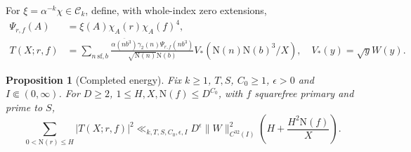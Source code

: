 \documentclass[11pt,a4paper]{article}
\numberwithin{equation}{section}
\newtheorem{proposition}[theorem]{Proposition}
\theoremstyle{definition}
\theoremstyle{remark}
\newcommand{\N}{\mathrm N}
\begin{document}
For $\xi=\alpha^{-k}\chi\in\mathscr C_k$, define, with whole-index zero extensions,
\begin{align}\label{eq:Psi}
 \Psi_{r,f}(A)&=\xi(A)\chi_A(r)\chi_A(f)^4,\\
 T(X;r,f)&=\sum_{n\ \mathrm{sf},b}
 \frac{\overline{\alpha(nb^3)}\gamma_2(n)\Psi_{r,f}(nb^3)}{\sqrt{\N(n)}\N(b)}
 V_*(\N(n)\N(b)^3/X),\quad V_*(y)=\sqrt yW(y).\label{eq:Tcompleted}
\end{align}
\begin{proposition}[Completed energy]\label{prop:completed}
Fix $k\ge1$, $T,S$, $C_0\ge1$, $\epsilon>0$ and $I\Subset(0,\infty)$. For $D\ge2$, $1\le H,X,\N(f)\le D^{C_0}$, with $f$ squarefree primary and prime to $S$,
\begin{equation}\label{eq:completedbound}
 \sum_{0<\N(r)\le H}|T(X;r,f)|^2
 \ll_{k,T,S,C_0,\epsilon,I}D^\epsilon\|W\|_{C^{32}(I)}^2
 \left(H+\frac{H^2\N(f)}X\right).
\end{equation}
\end{proposition}
\end{document}
